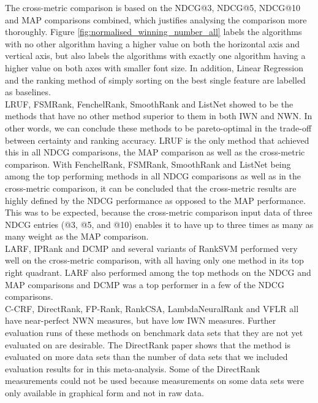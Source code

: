 The cross-metric comparison is based on the \ac{NDCG}@3, \ac{NDCG}@5, \ac{NDCG}@10 and \ac{MAP} comparisons combined, which justifies analysing the comparison more thoroughly. Figure \ref{fig:normalised_winning_number_all} labels the algorithms with no other algorithm having a higher value on both the horizontal axis and vertical axis, but also labels the algorithms with exactly one algorithm having a higher value on both axes with smaller font size. In addition, Linear Regression and the ranking method of simply sorting on the best single feature are labelled as baselines.\\

LRUF, FSMRank, FenchelRank, SmoothRank and ListNet showed to be the methods that have no other method superior to them in both \ac{IWN} and \ac{NWN}. In other words, we can conclude these methods to be pareto-optimal in the trade-off between certainty and ranking accuracy. LRUF is the only method that achieved this in all \ac{NDCG} comparisons, the \ac{MAP} comparison as well as the cross-metric comparison. With FenchelRank, FSMRank, SmoothRank and ListNet being among the top performing methods in all \ac{NDCG} comparisons as well as in the cross-metric comparison, it can be concluded that the cross-metric results are highly defined by the \ac{NDCG} performance as opposed to the \ac{MAP} performance. This was to be expected, because the cross-metric comparison input data of three \ac{NDCG} entries (@3, @5, and @10) enables it to have up to three times as many as many weight as the \ac{MAP} comparison.\\

LARF, \acs{IP}Rank and DCMP and several variants of Rank\ac{SVM} performed very well on the cross-metric comparison, with all having only one method in its top right quadrant. LARF also performed among the top methods on the \ac{NDCG} and \ac{MAP} comparisons and DCMP was a top performer in a few of the \ac{NDCG} comparisons.\\

C-CRF, DirectRank, FP-Rank, RankCSA, LambdaNeuralRank and VFLR all have near-perfect \ac{NWN} measures, but have low \ac{IWN} measures. Further evaluation runs of these methods on benchmark data sets that they are not yet evaluated on are desirable. The DirectRank paper \cite{Tan2013} shows that the method  is evaluated on more data sets than the number of data sets that we included evaluation results for in this meta-analysis. Some of the DirectRank measurements could not be used because measurements on some data sets were only available in graphical form and not in raw data.\\

